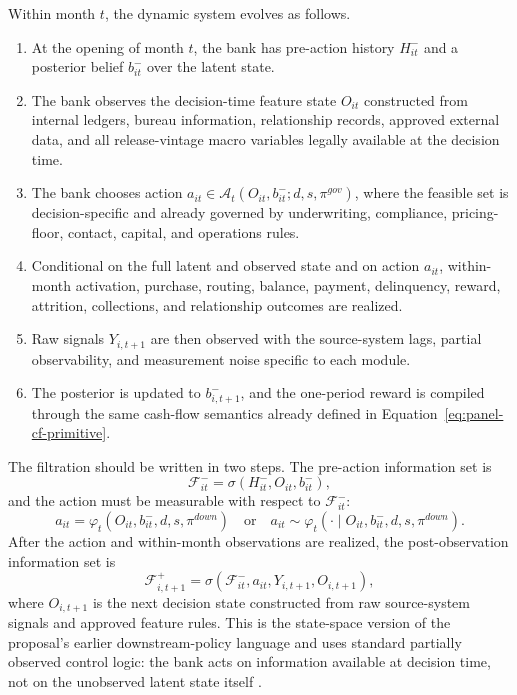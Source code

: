 \documentclass[11pt]{article}
\newcommand{\1}{\mathbf{1}}
\begin{document}
Within month $t$, the dynamic system evolves as follows.
\begin{enumerate}[label=\textbf{T\arabic*.},leftmargin=*]
  \item At the opening of month $t$, the bank has pre-action history
        $H_{it}^{-}$ and a posterior belief $b_{it}^{-}$ over the latent state.
  \item The bank observes the decision-time feature state $O_{it}$ constructed
        from internal ledgers, bureau information, relationship records,
        approved external data, and all release-vintage macro variables legally
        available at the decision time.
  \item The bank chooses action
        $a_{it}\in\mathcal{A}_{t}(O_{it},b_{it}^{-};d,s,\pi^{gov})$, where the
        feasible set is decision-specific and already governed by underwriting,
        compliance, pricing-floor, contact, capital, and operations rules.
  \item Conditional on the full latent and observed state and on action $a_{it}$,
        within-month activation, purchase, routing, balance, payment,
        delinquency, reward, attrition, collections, and relationship outcomes
        are realized.
  \item Raw signals $Y_{i,t+1}$ are then observed with the source-system lags,
        partial observability, and measurement noise specific to each module.
  \item The posterior is updated to $b_{i,t+1}^{-}$, and the one-period reward
        is compiled through the same cash-flow semantics already defined in
        Equation~\eqref{eq:panel-cf-primitive}.
\end{enumerate}

The filtration should be written in two steps. The pre-action information set is
\begin{equation}
  \mathcal{F}^{-}_{it}
  =
  \sigma(H_{it}^{-},O_{it},b_{it}^{-}),
  \label{eq:ss-pre-action-filtration}
\end{equation}
and the action must be measurable with respect to $\mathcal{F}^{-}_{it}$:
\begin{equation}
  a_{it}=\varphi_t(O_{it},b_{it}^{-},d,s,\pi^{down})
  \quad\text{or}\quad
  a_{it}\sim\varphi_t(\cdot\mid O_{it},b_{it}^{-},d,s,\pi^{down}).
  \label{eq:ss-policy-measurability}
\end{equation}
After the action and within-month observations are realized, the post-observation
information set is
\begin{equation}
  \mathcal{F}^{+}_{i,t+1}
  =
  \sigma(\mathcal{F}^{-}_{it},a_{it},Y_{i,t+1},O_{i,t+1}),
  \label{eq:ss-post-action-filtration}
\end{equation}
where $O_{i,t+1}$ is the next decision state constructed from raw source-system
signals and approved feature rules. This is the state-space version of the
proposal's earlier downstream-policy language and uses standard partially
observed control logic: the bank acts on information available at decision time,
not on the unobserved latent state itself
\citep{smallwood1973pomdp,kaelbling1998pomdp}.
\end{document}
